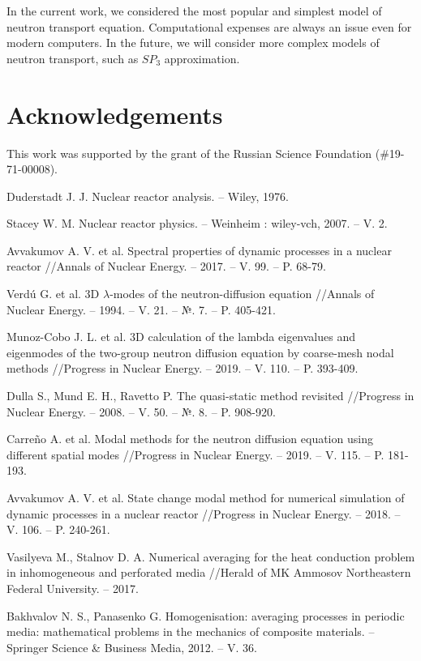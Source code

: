 \documentclass[runningheads]{llncs}
\begin{document}
In the current work, we considered the most popular and simplest model of neutron transport equation.
Computational expenses are always an issue even for modern computers.
In the future, we will consider more complex models of neutron transport, such as $SP_3$ approximation. 

\section*{Acknowledgements}
This work was supported by the grant of the Russian Science Foundation (\#19-71-00008).

\begin{thebibliography}{8}
Duderstadt J. J. Nuclear reactor analysis. – Wiley, 1976.

Stacey W. M. Nuclear reactor physics. – Weinheim : wiley-vch, 2007. – V. 2.

Avvakumov A. V. et al. Spectral properties of dynamic processes in a nuclear reactor //Annals of Nuclear Energy. – 2017. – V. 99. – P. 68-79.

Verdú G. et al. 3D $\lambda$-modes of the neutron-diffusion equation //Annals of Nuclear Energy. – 1994. – V. 21. – №. 7. – P. 405-421.

Munoz-Cobo J. L. et al. 3D calculation of the lambda eigenvalues and eigenmodes of the two-group neutron diffusion equation by coarse-mesh nodal methods //Progress in Nuclear Energy. – 2019. – V. 110. – P. 393-409.

Dulla S., Mund E. H., Ravetto P. The quasi-static method revisited //Progress in Nuclear Energy. – 2008. – V. 50. – №. 8. – P. 908-920.

Carreño A. et al. Modal methods for the neutron diffusion equation using different spatial modes //Progress in Nuclear Energy. – 2019. – V. 115. – P. 181-193.

Avvakumov A. V. et al. State change modal method for numerical simulation of dynamic processes in a nuclear reactor //Progress in Nuclear Energy. – 2018. – V. 106. – P. 240-261.

Vasilyeva M., Stalnov D. A. Numerical averaging for the heat conduction problem in inhomogeneous and perforated media //Herald of MK Ammosov Northeastern Federal University. – 2017.

Bakhvalov N. S., Panasenko G. Homogenisation: averaging processes in periodic media: mathematical problems in the mechanics of composite materials. – Springer Science \& Business Media, 2012. – V. 36.


\end{thebibliography}
\end{document}
